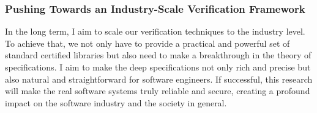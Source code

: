 \documentclass[a4paper, 10pt]{article}
\begin{document}
\begin{small}
\begin{comment}
Our device driver verification work~\cite{pldi16-device} shows that
it is promising to address these challenges based on the CertiKOS framework. For different systems, we could
provide ``customized" machine models
by exposing a particular set of hardware features
plus an abstract interface of the underlying systems.
It allows us to build certified layers for each system
in an isolated way and the  composition rules of CertiKOS
could be strengthened to link all these layers. My Yale colleagues
and I have already started to use CertiKOS to verify more systems in this stack,
such as the file system and the network stacks.
Meanwhile, I also work with  a research group from University of Pennsylvania to
set up a specification-based testing framework
that enables the random test for user-level applications upon the topmost layer interface of mCertiKOS.
I believe there is a huge research opportunity that
lies in this zero-vulnerability system stack
and I am looking forward to exploring it.
\end{comment}


\subsubsection*{\small Pushing Towards  an Industry-Scale Verification Framework}
In the long term, I aim to 
scale our verification techniques  to the industry level. To achieve that, we not only have to provide a practical and powerful
set of standard certified libraries but also need to make a breakthrough in the theory of specifications. I aim to make the deep specifications  not only rich and precise 
but also natural and straightforward for software engineers.
If successful,
this research will make
the real software systems truly reliable and secure, creating  a profound impact on the software industry
 and the society in general.
 
\vspace{0.5cm}

\end{small}
\end{document}
